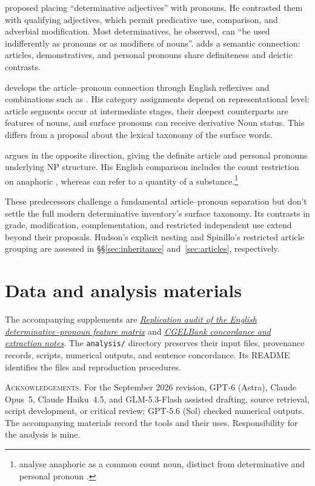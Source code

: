 \documentclass[12pt]{article}
\begin{document}
\textcite[24]{palmer1924} proposed placing \enquote{determinative adjectives} with pronouns. He contrasted them with qualifying adjectives, which permit predicative use, comparison, and adverbial modification. Most determinatives, he observed, can \enquote{be used indifferently as pronouns or as modifiers of nouns}. \textcite[279]{lyons1968} adds a semantic connection: articles, demonstratives, and personal pronouns share definiteness and deictic contrasts.

\textcite{postal1966} develops the article--pronoun connection through English reflexives and combinations such as . His category assignments depend on representational level: article segments occur at intermediate stages, their deepest counterparts are features of nouns, and surface pronouns can receive derivative Noun status. This differs from a proposal about the lexical taxonomy of the surface words.

\textcite[197--203]{sommerstein1972} argues in the opposite direction, giving the definite article and personal pronouns underlying NP structure. His English comparison includes the count restriction on anaphoric , whereas  can refer to a quantity of a substance.\footnote{\textcite[797--798]{payne2013anaphoric} analyse anaphoric  as a common count noun, distinct from determinative  and personal pronoun .}

These predecessors challenge a fundamental article--pronoun separation but don't settle the full modern determinative inventory's surface taxonomy. Its contrasts in grade, modification, complementation, and restricted independent use extend beyond their proposals. Hudson's explicit nesting and Spinillo's restricted article grouping are assessed in §§\ref{sec:inheritance} and~\ref{sec:articles}, respectively.

\section*{Data and analysis materials}

The accompanying supplements are \href{run:matrix-audit.pdf}{\textit{Replication audit of the English determinative--pronoun feature matrix}} and \href{run:corpus-documentation.pdf}{\textit{CGELBank concordance and extraction notes}}. The \texttt{analysis/} directory preserves their input files, provenance records, scripts, numerical outputs, and sentence concordance. Its README identifies the files and reproduction procedures.

\vspace{0.5\baselineskip}
\noindent\textsc{Acknowledgements.} For the September 2026 revision, GPT-6 (Astra), Claude Opus~5, Claude Haiku~4.5, and GLM-5.3-Flash assisted drafting, source retrieval, script development, or critical review; GPT-5.6 (Sol) checked numerical outputs. The accompanying materials record the tools and their uses. Responsibility for the analysis is mine.

\clearpage
\printbibliography
\end{document}
